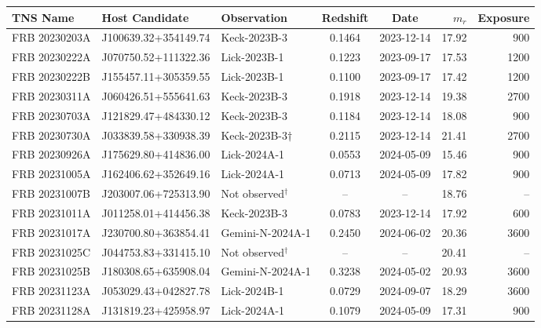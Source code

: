 \begin{tabular}{lllccrr}
\hline
 TNS Name     & Host Candidate       & Observation  &   Redshift & Date &      $m_r$ &   Exposure \\
\hline 
 FRB 20230203A & J100639.32+354149.74 & Keck-2023B-3 &     0.1464 & 2023-12-14      &      17.92 &           900 \\
 FRB 20230222A & J070750.52+111322.36 & Lick-2023B-1 &     0.1223 & 2023-09-17      &      17.53 &          1200 \\
 FRB 20230222B & J155457.11+305359.55 & Lick-2023B-1 &     0.1100 & 2023-09-17      &      17.42 &          1200 \\
 FRB 20230311A & J060426.51+555641.63 & Keck-2023B-3 &     0.1918 & 2023-12-14      &      19.38 &          2700 \\
 FRB 20230703A & J121829.47+484330.12 & Keck-2023B-3 &     0.1184 & 2023-12-14      &      18.08 &           900 \\
 FRB 20230730A & J033839.58+330938.39 & Keck-2023B-3$\dagger$ &     0.2115 & 2023-12-14      &      21.41 &          2700 \\
 FRB 20230926A & J175629.80+414836.00 & Lick-2024A-1 &     0.0553 & 2024-05-09      &      15.46 &           900 \\
 FRB 20231005A & J162406.62+352649.16 & Lick-2024A-1 &     0.0713 & 2024-05-09      &      17.82 &           900 \\
 FRB 20231007B & J203007.06+725313.90 & Not observed$^\dagger$        &         -- &         --      &      18.76 &            -- \\
 FRB 20231011A & J011258.01+414456.38 & Keck-2023B-3 &     0.0783 & 2023-12-14      &      17.92 &           600 \\
 FRB 20231017A & J230700.80+363854.41 & Gemini-N-2024A-1 &     0.2450 & 2024-06-02       &      20.36 &          3600 \\
 FRB 20231025C & J044753.83+331415.10 & Not observed$^\dagger$        &         -- &              -- &      20.41 &            -- \\
 FRB 20231025B & J180308.65+635908.04 & Gemini-N-2024A-1    &     0.3238 &              2024-05-02  &      20.93 &            3600 \\
 FRB 20231123A & J053029.43+042827.78 & Lick-2024B-1 &     0.0729 & 2024-09-07      &      18.29 &          3600 \\
 FRB 20231128A & J131819.23+425958.97 & Lick-2024A-1 &     0.1079 & 2024-05-09      &      17.31 &           900 \\

\end{tabular}
